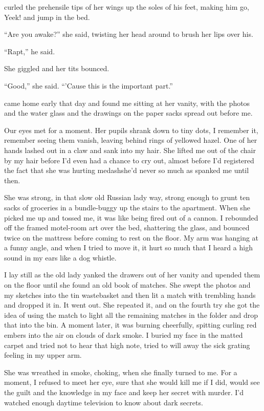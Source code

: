  curled the prehensile tips of her wings up the soles of his feet,
making him go, Yeek!  and jump in the bed.

``Are you awake?'' she said, twisting her head around to brush her
lips over his.

``Rapt,'' he said.

She giggled and her tits bounced.

``Good,'' she said.  ``'Cause this is the important part.''

 came home early that day and found me sitting at her vanity,
with the photos and the water glass and the drawings on the paper
sacks spread out before me.

Our eyes met for a moment.  Her pupils shrank down to tiny dots, I
remember it, remember seeing them vanish, leaving behind rings of
yellowed hazel.  One of her hands lashed out in a claw and sank into
my hair.  She lifted me out of the chair by my hair before I'd even
had a chance to cry out, almost before I'd registered the fact that
she was hurting medash{}she'd never so much as spanked me until then.

She was strong, in that slow old Russian lady way, strong enough to
grunt ten sacks of groceries in a bundle-buggy up the stairs to the
apartment.  When she picked me up and tossed me, it was like being
fired out of a cannon.  I rebounded off the framed motel-room art over
the bed, shattering the glass, and bounced twice on the mattress
before coming to rest on the floor.  My arm was hanging at a funny
angle, and when I tried to move it, it hurt so much that I heard a
high sound in my ears like a dog whistle.

I lay still as the old lady yanked the drawers out of her vanity and
upended them on the floor until she found an old book of matches.  She
swept the photos and my sketches into the tin wastebasket and then lit
a match with trembling hands and dropped it in.  It went out.  She
repeated it, and on the fourth try she got the idea of using the match
to light all the remaining matches in the folder and drop that into
the bin.  A moment later, it was burning cheerfully, spitting curling
red embers into the air on clouds of dark smoke.  I buried my face in
the matted carpet and tried not to hear that high note, tried to will
away the sick grating feeling in my upper arm.

She was wreathed in smoke, choking, when she finally turned to me. 
For a moment, I refused to meet her eye, sure that she would kill me
if I did, would see the guilt and the knowledge in my face and keep
her secret with murder.  I'd watched enough daytime television to know
about dark secrets.

